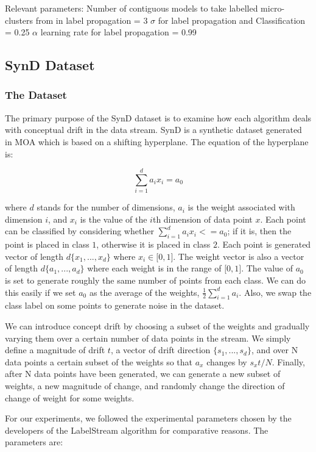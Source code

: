 \documentclass[12pt,a4paper,oneside]{report}
\begin{document}
Relevant parameters:
Number of contiguous models to take labelled micro-clusters from in label propagation = $3$
$\sigma$ for label propagation and Classification = 0.25
$\alpha$ learning rate for label propagation = 0.99

\subsection{SynD Dataset}

\subsubsection{The Dataset}
The primary purpose of the SynD dataset is to examine how each algorithm deals with conceptual drift in the data stream. SynD is a synthetic dataset generated in MOA which is based on a shifting hyperplane. The equation of the hyperplane is:

\[  \sum_{i = 1}^d a_i x_i = a_0 \]

where \(d\) stands for the number of dimensions, \( a_i \) is the weight associated with dimension \(i\),  and \(x_i\) is the value of the \(i\)th dimension of data point \(x\). Each point can be classified by considering whether  \(  \sum_{i = 1}^d a_i x_i <= a_0 \); if it is, then the point is placed in class \(1\), otherwise it is placed in class \(2\). Each point is generated vector of length \( d  \lbrace x_1,...,x_d  \rbrace \) where \( x_i  \in \lbrack  0,1 \rbrack \).  The weight vector is also a vector of length \( d  \lbrace a_1,...,a_d  \rbrace \) where each weight is in the range of \( \lbrack 0,1 \rbrack \).  The value of \( a_0 \) is set to generate roughly the same number of points from each class. We can do this easily if we set \(a_0\) as the average of the weights, \( \frac{1}{2} \sum_{i=1}^d a_i\). Also, we swap the class label on some points to generate noise in the dataset. 

We can introduce concept drift by choosing a subset of the weights and gradually varying them over a certain number of data points in the stream. We simply define a magnitude of drift \(t\), a vector of drift direction  \( \lbrace s_1,...,s_d  \rbrace \), and over N data points a certain subset of the weights so that \( a_x \) changes by \(  s_xt / N \). Finally, after N data points have been generated, we can generate a new subset of weights, a new magnitude of change, and randomly change the direction of change of weight for some weights.

For our experiments, we followed the experimental parameters chosen by the developers of the LabelStream algorithm for comparative reasons. The parameters are:
\end{document}
